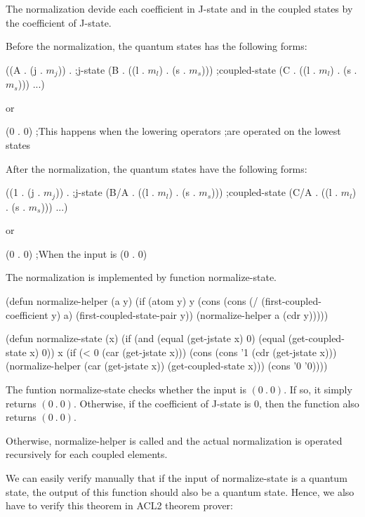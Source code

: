 \documentclass[12pt,journal,compsoc]{IEEEtran}
\begin{document}
The normalization devide each coefficient in J-state and in the coupled states by the coefficient of J-state. 

Before the normalization, the quantum states has the following forms: 

\begin{acl2-lst}
((A . (j . $m_j$)) .   ;j-state
(B . ((l . $m_l$) . (s . $m_s$))) ;coupled-state
(C . ((l . $m_l$) . (s . $m_s$)))
...)
\end{acl2-lst}

or

\begin{acl2-lst}
(0 . 0) 
;This happens when the lowering operators 
;are operated on the lowest states
\end{acl2-lst}

After the normalization, the quantum states have the following forms:

\begin{acl2-lst}
((1 . (j . $m_j$)) .   ;j-state
(B/A . ((l . $m_l$) . (s . $m_s$))) ;coupled-state
(C/A . ((l . $m_l$) . (s . $m_s$)))
...)
\end{acl2-lst}

or

\begin{acl2-lst}
(0 . 0) ;When the input is (0 . 0)
\end{acl2-lst}

The normalization is implemented by function normalize-state.

\begin{acl2-lst}
(defun normalize-helper (a y)
 (if (atom y)
  y
  (cons (cons (/ (first-coupled-coefficient y) a) 
	 (first-coupled-state-pair y))
   (normalize-helper a (cdr y)))))

(defun normalize-state (x)
 (if (and (equal (get-jstate x) 0)
      (equal (get-coupled-state x) 0))
  x
  (if (< 0 (car (get-jstate x)))
   (cons (cons '1 (cdr (get-jstate x)))
    (normalize-helper (car (get-jstate x)) 
     (get-coupled-state x)))
   (cons '0 '0))))	
\end{acl2-lst}

The funtion normalize-state checks whether the input is $(0\ .\ 0)$. If so, it simply returns $(0\ .\ 0)$. Otherwise, if the coefficient of J-state is 0, then the function also returns $(0\ .\ 0)$. 

Otherwise, normalize-helper is called and the actual normalization is operated recursively for each coupled elements.

We can easily verify manually that if the input of normalize-state is a quantum state, the output of this function should also be a quantum state. Hence, we also have to verify this theorem in ACL2 theorem prover:
\end{document}
